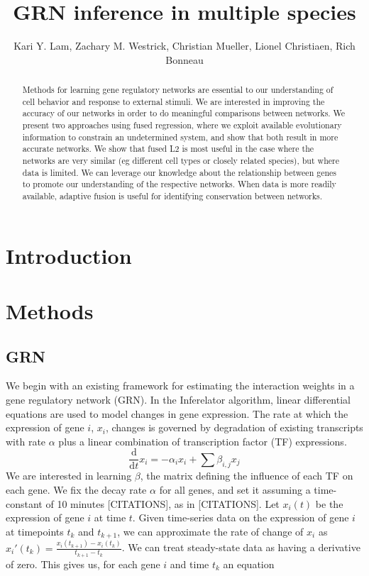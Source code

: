 \documentclass[11pt]{article}
\begin{document}
\title{GRN inference in multiple species}
\author{Kari Y. Lam, Zachary M. Westrick, Christian Mueller, Lionel Christiaen, Rich Bonneau}
\maketitle

\begin{abstract}
Methods for learning gene regulatory networks are essential to our understanding of cell behavior and response to external stimuli. We are interested in improving the accuracy of our networks in order to do meaningful comparisons between networks. We present two approaches using fused regression, where we exploit available evolutionary information to constrain an undetermined system, and show that both result in more accurate networks. We show that fused L2 is most useful in the case where the networks are very similar (eg different cell types or closely related species), but where data is limited. We can leverage our knowledge about the relationship between genes to promote our understanding of the respective networks. When data is more readily available, adaptive fusion is useful for identifying conservation between networks. 

\end{abstract}

\section{Introduction}

\section{Methods}
\subsection{GRN}
We begin with an existing framework for estimating the interaction weights in a gene regulatory network (GRN). In the Inferelator algorithm, linear differential equations are used to model changes in gene expression. The rate at which the expression of gene $i$, $x_i$, changes is governed by degradation of existing transcripts with rate $\alpha$ plus a linear combination of transcription factor (TF) expressions.
\begin{equation}
\frac{\mathrm d}{\mathrm d t} x_i = -\alpha_{i}x_{i} + \sum \beta_{i,j}x_{j}
\end{equation}
We are interested in learning $\beta$, the matrix defining the influence of each TF on each gene. We fix the decay rate $\alpha$ for all genes, and set it assuming a time-constant of 10 minutes [CITATIONS], as in [CITATIONS]. Let $x_i(t)$ be the expression of gene $i$ at time $t$. Given time-series data on the expression of gene $i$ at timepoints $t_k$ and $t_{k+1}$, we can approximate the rate of change of $x_i$ as $x_i'(t_k)=\frac{x_i(t_{k+1})-x_i(t_k)}{t_{k+1}-t_k}$. We can treat steady-state data as having a derivative of zero. This gives us, for each gene $i$ and time $t_{k}$ an equation
\end{document}
